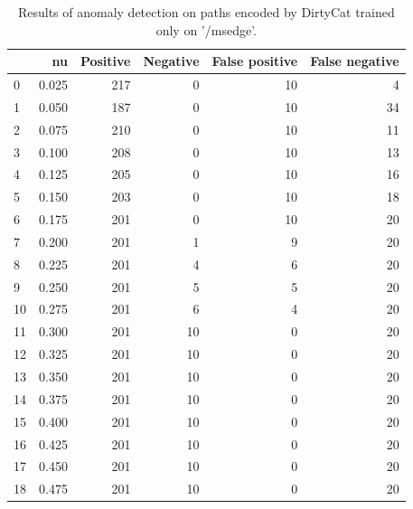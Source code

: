 \documentclass[a4paper,twoside,12pt]{book}
\begin{document}
\begin{appendices}
\begin{table}
	\centering
	\caption{Results of anomaly detection on paths encoded by DirtyCat trained only on '/msedge'.}
	\label{id:tab:ocsvmOnDirtyCatMsEdge}
	\begin{tabular}{lrrrrr}
		\toprule
		{} &     nu &  Positive &  Negative &  False positive &  False negative \\
		\midrule
		0  &  0.025 &       217 &         0 &              10 &               4 \\
		1  &  0.050 &       187 &         0 &              10 &              34 \\
		2  &  0.075 &       210 &         0 &              10 &              11 \\
		3  &  0.100 &       208 &         0 &              10 &              13 \\
		4  &  0.125 &       205 &         0 &              10 &              16 \\
		5  &  0.150 &       203 &         0 &              10 &              18 \\
		6  &  0.175 &       201 &         0 &              10 &              20 \\
		7  &  0.200 &       201 &         1 &               9 &              20 \\
		8  &  0.225 &       201 &         4 &               6 &              20 \\
		9  &  0.250 &       201 &         5 &               5 &              20 \\
		10 &  0.275 &       201 &         6 &               4 &              20 \\
		11 &  0.300 &       201 &        10 &               0 &              20 \\
		12 &  0.325 &       201 &        10 &               0 &              20 \\
		13 &  0.350 &       201 &        10 &               0 &              20 \\
		14 &  0.375 &       201 &        10 &               0 &              20 \\
		15 &  0.400 &       201 &        10 &               0 &              20 \\
		16 &  0.425 &       201 &        10 &               0 &              20 \\
		17 &  0.450 &       201 &        10 &               0 &              20 \\
		18 &  0.475 &       201 &        10 &               0 &              20 \\

\end{tabular}
\end{table}
\end{appendices}
\end{document}
